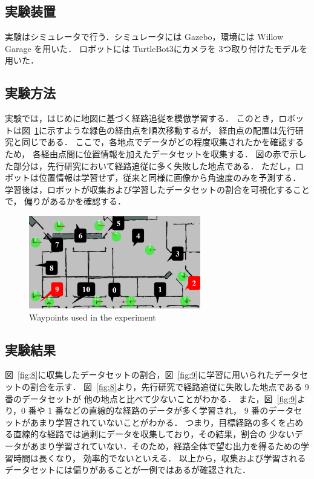 \documentclass{jarticle}
\renewcommand{\figurename}{図~}
\newcommand{\figref}[1]{\figurename\ref{#1}}
\begin{document}
\subsection{実験装置}
実験はシミュレータで行う．シミュレータには Gazebo\cite{gazebo}，環境には Willow Garage を用いた．
ロボットには TurtleBot3\cite{TurtleBot3}にカメラを 3つ取り付けたモデルを用いた．

\subsection{実験方法}
実験では，はじめに地図に基づく経路追従を模倣学習する．
このとき，ロボットは\figref{fig:6}に示すような緑色の経由点を順次移動するが，
経由点の配置は先行研究\cite{imai2}と同じである．
ここで，各地点でデータがどの程度収集されたかを確認するため，
各経由点間に位置情報を加えたデータセットを収集する．
図の赤で示した部分は，先行研究において経路追従に多く失敗した地点である．
ただし，ロボットは位置情報は学習せず，従来と同様に画像から角速度のみを予測する．
学習後は，ロボットが収集および学習したデータセットの割合を可視化することで，
偏りがあるかを確認する．

\begin{figure}[h!]
  \centering
   \includegraphics[height=40.5mm]{./pdf/location.pdf}
   \caption{Waypoints used in the experiment}
   \label{fig:6}
\end{figure}

\subsection{実験結果}
\figref{fig:8}に収集したデータセットの割合，\figref{fig:9}に学習に用いられたデータセットの割合を示す．
\figref{fig:8}より，先行研究で経路追従に失敗した地点である 9 番のデータセットが
他の地点と比べて少ないことがわかる．
また，\figref{fig:9}より，0 番や 1 番などの直線的な経路のデータが多く学習され，
9 番のデータセットがあまり学習されていないことがわかる．
つまり，目標経路の多くを占める直線的な経路では過剰にデータを収集しており，その結果，割合の
少ないデータがあまり学習されていない．そのため，経路全体で望む出力を得るための学習時間は長くなり，
効率的でないといえる．
以上から，収集および学習されるデータセットには偏りがあることが一例ではあるが確認された．
\end{document}
